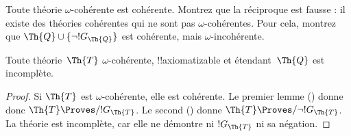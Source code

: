 \documentclass[../../../include/open-logic-section]{subfiles}
\begin{document}
\begin{prob}
Toute théorie $\omega$-cohérente est cohérente.
Montrez que la réciproque est fausse : il existe
des théories cohérentes qui ne sont pas
$\omega$-cohérentes. Pour cela, montrez que
$\Th{Q}\cup\{\lnot !G_\Th{Q}\}$ est cohérente,
mais $\omega$-incohérente.
\end{prob}

\begin{thm}
Toute théorie~$\Th{T}$ $\omega$-cohérente,
!!{axiomatizable} et étendant~$\Th{Q}$ est
incomplète.
\end{thm}

\begin{proof}
Si $\Th{T}$ est $\omega$-cohérente, elle est
cohérente. Le premier lemme
() donne donc
$\Th{T}\Proves/ !G_\Th{T}$. Le second
() donne
$\Th{T}\Proves/\lnot !G_\Th{T}$.
La théorie est incomplète, car elle ne démontre
ni $!G_\Th{T}$ ni sa négation.
\end{proof}
\end{document}
